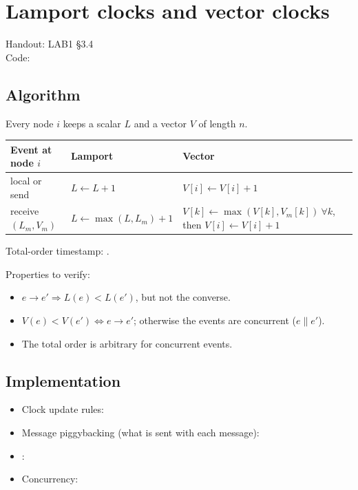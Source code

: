 \section{Lamport clocks and vector clocks}\label{sec:lc}
Handout: LAB1 §3.4 \\
Code: 

\subsection{Algorithm}
Every node $i$ keeps a scalar $L$ and a vector $V$ of length $n$.
\begin{center}\small
\begin{tabular}{@{}lll@{}}
\toprule
Event at node $i$ & Lamport & Vector \\ \midrule
local or send & $L \leftarrow L+1$ & $V[i] \leftarrow V[i]+1$ \\
receive $(L_m, V_m)$ & $L \leftarrow \max(L, L_m)+1$ &
  $V[k] \leftarrow \max(V[k], V_m[k])\ \forall k$, then $V[i] \leftarrow V[i]+1$ \\
\bottomrule
\end{tabular}
\end{center}
Total-order timestamp: .

Properties to verify:
\begin{itemize}[itemsep=1pt]
  \item $e \to e' \Rightarrow L(e) < L(e')$, but not the converse.
  \item $V(e) < V(e') \iff e \to e'$; otherwise the events are concurrent ($e \parallel e'$).
  \item The total order is arbitrary for concurrent events.
\end{itemize}

\subsection{Implementation}
\begin{itemize}[itemsep=2pt]
  \item Clock update rules: 
  \item Message piggybacking (what is sent with each message): \TODO{}
  \item {}: 
  \item Concurrency: 
\end{itemize}

